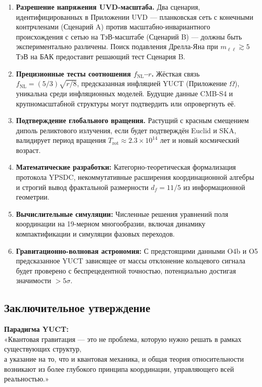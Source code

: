 \documentclass[12pt,a4paper]{article}
\theoremstyle{remark}
\begin{document}
	\begin{enumerate}
		\item \textbf{Разрешение напряжения UVD-масштаба.} Два сценария, идентифицированных в Приложении UVD — планковская сеть с конечными контрчленами (Сценарий A) против масштабно-инвариантного происхождения с сетью на ТэВ-масштабе (Сценарий B) — должны быть экспериментально различены. Поиск подавления Дрелла-Яна при $m_{\ell\ell}\gtrsim5$ ТэВ на БАК предоставит решающий тест Сценария B.
		
		\item \textbf{Прецизионные тесты соотношения $f_{\mathrm{NL}}$–$r$.} Жёсткая связь $f_{\mathrm{NL}}=(5/3)\sqrt{r/8}$, предсказанная инфляцией YUCT (Приложение $\Omega$), уникальна среди инфляционных моделей. Будущие данные CMB-S4 и крупномасштабной структуры могут подтвердить или опровергнуть её.
		
		\item \textbf{Подтверждение глобального вращения.} Растущий с красным смещением диполь реликтового излучения, если будет подтверждён Euclid и SKA, валидирует период вращения $T_{\mathrm{rot}}\approx2.3\times10^{14}$ лет и новый космический возраст.
		
		\item \textbf{Математические разработки:} Категорно-теоретическая формализация протокола YPSDC, некоммутативные расширения координационной алгебры и строгий вывод фрактальной размерности $d_f=11/5$ из информационной геометрии.
		
		\item \textbf{Вычислительные симуляции:} Численные решения уравнений поля координации на 19-мерном многообразии, включая динамику компактификации и симуляции фазовых переходов.
		
		\item \textbf{Гравитационно-волновая астрономия:} С предстоящими данными O4b и O5 предсказанное YUCT зависящее от массы отклонение кольцевого сигнала будет проверено с беспрецедентной точностью, потенциально достигая значимости $>5\sigma$.
	\end{enumerate}
	
	\subsection{Заключительное утверждение}
	
	\begin{center}
		\textbf{Парадигма YUCT:}\\
		«Квантовая гравитация — это не проблема, которую нужно решать в рамках существующих структур,\\
		а указание на то, что и квантовая механика, и общая теория относительности\\
		возникают из более глубокого принципа координации, управляющего всей реальностью.»
	\end{center}
	
\end{document}
